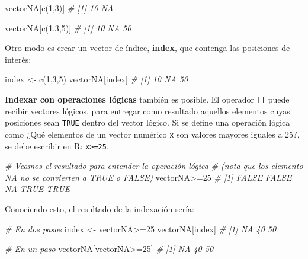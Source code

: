 \documentclass[
]{article}
\newenvironment{Shaded}{\begin{snugshade}}{\end{snugshade}}
\newcommand{\CommentTok}[1]{\textcolor[rgb]{0.56,0.35,0.01}{\textit{#1}}}
\newcommand{\DecValTok}[1]{\textcolor[rgb]{0.00,0.00,0.81}{#1}}
\newcommand{\FunctionTok}[1]{\textcolor[rgb]{0.00,0.00,0.00}{#1}}
\newcommand{\NormalTok}[1]{#1}
\newcommand{\OtherTok}[1]{\textcolor[rgb]{0.56,0.35,0.01}{#1}}
\newcommand{\SpecialCharTok}[1]{\textcolor[rgb]{0.00,0.00,0.00}{#1}}
\theoremstyle{definition}
\theoremstyle{definition}
\theoremstyle{definition}
\theoremstyle{definition}
\theoremstyle{remark}
\begin{document}
\begin{Shaded}
\begin{Highlighting}[]
\NormalTok{vectorNA[}\FunctionTok{c}\NormalTok{(}\DecValTok{1}\NormalTok{,}\DecValTok{3}\NormalTok{)]}
\CommentTok{\# [1] 10 NA}

\NormalTok{vectorNA[}\FunctionTok{c}\NormalTok{(}\DecValTok{1}\NormalTok{,}\DecValTok{3}\NormalTok{,}\DecValTok{5}\NormalTok{)]}
\CommentTok{\# [1] 10 NA 50}
\end{Highlighting}
\end{Shaded}

Otro modo es crear un vector de índice, \textbf{index}, que contenga las posiciones de interés:

\begin{Shaded}
\begin{Highlighting}[]
\NormalTok{index }\OtherTok{\textless{}{-}} \FunctionTok{c}\NormalTok{(}\DecValTok{1}\NormalTok{,}\DecValTok{3}\NormalTok{,}\DecValTok{5}\NormalTok{)}
\NormalTok{vectorNA[index]}
\CommentTok{\# [1] 10 NA 50}
\end{Highlighting}
\end{Shaded}

\textbf{Indexar con operaciones lógicas} también es posible. El operador \texttt{{[}{]}} puede recibir vectores lógicos, para entregar como resultado aquellos elementos cuyas posiciones sean \texttt{TRUE} dentro del vector lógico. Si se define una operación lógica como ¿Qué elementos de un vector numérico \texttt{x} son valores mayores iguales a 25?, se debe escribir en R: \texttt{x\textgreater{}=25}.

\begin{Shaded}
\begin{Highlighting}[]
\CommentTok{\# Veamos el resultado para entender la operación lógica}
\CommentTok{\# (nota que los elemento NA no se convierten a TRUE o FALSE)}
\NormalTok{vectorNA}\SpecialCharTok{\textgreater{}=}\DecValTok{25}
\CommentTok{\# [1] FALSE FALSE    NA  TRUE  TRUE}
\end{Highlighting}
\end{Shaded}

Conociendo esto, el resultado de la indexación sería:

\begin{Shaded}
\begin{Highlighting}[]
\CommentTok{\# En dos pasos}
\NormalTok{index }\OtherTok{\textless{}{-}}\NormalTok{ vectorNA}\SpecialCharTok{\textgreater{}=}\DecValTok{25}
\NormalTok{vectorNA[index]}
\CommentTok{\# [1] NA 40 50}

\CommentTok{\# En un paso}
\NormalTok{vectorNA[vectorNA}\SpecialCharTok{\textgreater{}=}\DecValTok{25}\NormalTok{]}
\CommentTok{\# [1] NA 40 50}
\end{Highlighting}
\end{Shaded}
\end{document}
